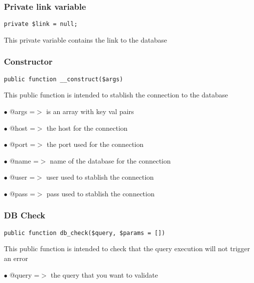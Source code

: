 \documentclass[a4paper]{article}
\begin{document}
\hypertarget{toc329}{}
\subsubsection{Private link variable}

\begin{lstlisting}
private $link = null;
\end{lstlisting}

This private variable contains the link to the database

\hypertarget{toc330}{}
\subsubsection{Constructor}

\begin{lstlisting}
public function __construct($args)
\end{lstlisting}

This public function is intended to stablish the connection to the database

\begin{compactitem}
\item[\color{myblue}$\bullet$] @args =$>$ is an array with key val pairs
\item[\color{myblue}$\bullet$] @host =$>$ the host for the connection
\item[\color{myblue}$\bullet$] @port =$>$ the port used for the connection
\item[\color{myblue}$\bullet$] @name =$>$ name of the database for the connection
\item[\color{myblue}$\bullet$] @user =$>$ user used to stablish the connection
\item[\color{myblue}$\bullet$] @pass =$>$ pass used to stablish the connection
\end{compactitem}

\hypertarget{toc331}{}
\subsubsection{DB Check}

\begin{lstlisting}
public function db_check($query, $params = [])
\end{lstlisting}

This public function is intended to check that the query execution will not trigger an error

\begin{compactitem}
\item[\color{myblue}$\bullet$] @query =$>$ the query that you want to validate
\end{compactitem}
\end{document}
